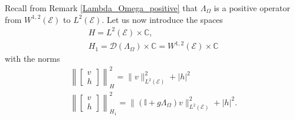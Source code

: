 \documentclass{amsart} %
\numberwithin{equation}{section}
\theoremstyle{definition}
\begin{document}
Recall from Remark \ref{Lambda_Omega_positive} that  $\Lambda_{\Omega}$ is a positive operator from $W^{1,2}(\mathcal{E})$ to $L^2(\mathcal{E})$. Let us now introduce the spaces
\begin{gather}
H=L^2(\mathcal{E})\times\mathbb{C},\\ H_1=\mathcal{D}(\Lambda_{\Omega})\times\mathbb{C}=W^{1,2}(\mathcal{E})\times\mathbb{C}   
\end{gather} 
with the norms
\begin{gather}
\left\|\begin{bmatrix} v\\ h\end{bmatrix}\right\|_{H}^2=\|v\|_{L^2(\mathcal{E})}^2+ |h|^2\\
\left\|\begin{bmatrix} v\\ h\end{bmatrix}\right\|_{H_1}^2=\|(\mathbb{I}+g\Lambda_{\Omega})v\|_{L^2(\mathcal{E})}^2+ |h|^2.
\end{gather} 
\end{document}
